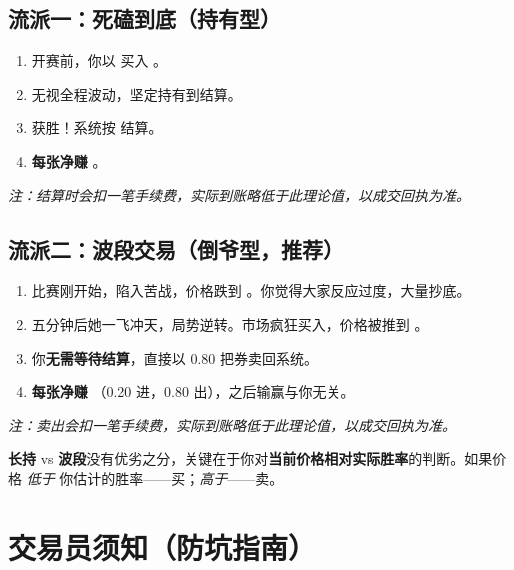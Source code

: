\documentclass[11pt,a4paper,twoside]{article}
\begin{document}
\subsection{流派一：死磕到底（持有型）}

\begin{exbox}
\begin{enumerate}
  \item 开赛前，你以  买入 \Acard。
  \item 无视全程波动，坚定持有到结算。
  \item \Reimu 获胜！系统按  结算。
  \item \textbf{每张净赚 }。
\end{enumerate}
\smallskip
\textcolor{soft}{\footnotesize \textit{注：结算时会扣一笔手续费，实际到账略低于此理论值，以成交回执为准。}}
\end{exbox}

\subsection{流派二：波段交易（倒爷型，推荐）}

\begin{exbox}
\begin{enumerate}
  \item 比赛刚开始，\Reimu 陷入苦战，价格跌到 。你觉得大家反应过度，大量抄底。
  \item 五分钟后她一飞冲天，局势逆转。市场疯狂买入，价格被推到 。
  \item 你\textbf{无需等待结算}，直接以 0.80 把券卖回系统。
  \item \textbf{每张净赚 }（0.20 进，0.80 出），之后输赢与你无关。
\end{enumerate}
\smallskip
\textcolor{soft}{\footnotesize \textit{注：卖出会扣一笔手续费，实际到账略低于此理论值，以成交回执为准。}}
\end{exbox}

\begin{tipbox}
\textbf{长持} vs \textbf{波段}没有优劣之分，关键在于你对\textbf{当前价格相对实际胜率}的判断。如果价格 \textit{低于} 你估计的胜率——买；\textit{高于}——卖。
\end{tipbox}

\section{交易员须知（防坑指南）}
\end{document}
